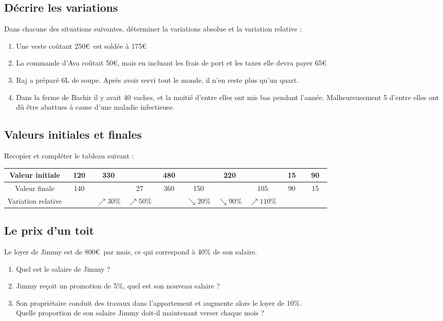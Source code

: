\documentclass[oneside,12pt]{article}          %
\begin{document}
\subsection{Décrire les variations}
Dans chacune des situations suivantes, déterminer la variations absolue et la variation relative :
\begin{enumerate}
    \item Une veste coûtant 250\euro\, est soldée à 175\euro
    \item La commande d'Ava coûtait 50\euro, mais en incluant les frais de port et les taxes elle devra payer 65\euro
    \item Raj a préparé 6L de soupe. Après avoir servi tout le monde, il n'en reste plus qu'un quart.
    \item Dans la ferme de Bachir il y avait 40 vaches, et la moitié d'entre elles ont mis bas pendant l'année. Malheureusement 5 d'entre elles ont dû être abattues à cause d'une maladie infectieuse.
\end{enumerate}


\subsection{Valeurs initiales et finales}
Recopier et compléter le tableau suivant :

\begin{center}
    \renewcommand{\arraystretch}{1.5}
    \begin{tabular}{|c||c|c|c|c|c|c|c|c|c|} \hline
        Valeur initiale & ~120~ & ~330~ & & ~480~ & & 220 & & ~15~& ~90~ \\ \hline
        Valeur finale & ~140~ & & ~27~ & ~360~ & ~150~ & & 105 & ~90~ & ~15~ \\ \hline
        Variation relative & & $\nearrow 30\%$ & $\nearrow 50\%$ & & $\searrow20\%$ & $\searrow90\% $ & $\nearrow110\% $& & \\ \hline
    \end{tabular}    
\end{center}



\subsection{Le prix d'un toit}
Le loyer de Jimmy est de 800\euro\, par mois, ce qui correspond à 40$\%$ de son salaire.
\begin{enumerate}
    \item Quel est le salaire de Jimmy ?
    \item Jimmy reçoit un promotion de 5$\%$, quel est son nouveau salaire ?
    \item Son propriétaire conduit des travaux dans l'appartement et augmente alors le loyer de 10$\%$. \\
    Quelle proportion de son salaire Jimmy doit-il maintenant verser chaque mois ?
\end{enumerate}
\end{document}

